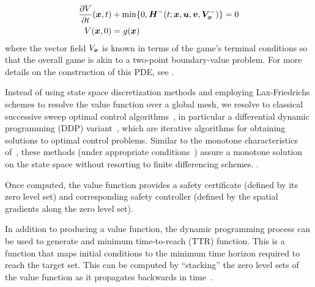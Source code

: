 	\begin{align}
		\frac{\partial V}{\partial t}{(\bm{x}, t)} & + \min \{0, \lowerham (t; \bm{x}, \bm{u}, \bm{v},\lowervalue_{\state}) \} = 0 \\
		V(\bm{x},0) &= g(\bm{x})
		\label{eq:lower_hji_pde}
	\end{align}
%
\noindent where the vector field $V_{\bm{x}}$ is known in terms of the game's terminal conditions so that the overall game is akin to a two-point boundary-value problem. For more details on the construction of this PDE, see \citet{Mitchell2005}.

Instead of using state space discretization methods and employing Lax-Friedrichs schemes to resolve the value function   over a global mesh, we resolve to classical successive sweep optimal control algorithms~\citet{Mitter1966, McReynolds1967}, in particular a differential dynamic programming (DDP) variant~\citet{Mayne1966, Jacobson1968new, JacobsonMayne}, which are iterative algorithms for obtaining solutions to optimal control problems. Similar to the monotone  characteristics of~\citet{CrandallLaxFriedrichs, CrandallFractional}, these methods (under appropriate conditions~\citet{iDG}) assure a monotone solution on the state space without resorting to finite differencing schemes.  
.
 

Once computed, the value function provides a safety certificate (defined by its zero level set) and corresponding safety controller (defined by the spatial gradients along the zero level set). 

In addition to producing a value function, the dynamic programming process can be used to generate and minimum time-to-reach (TTR) function. This is a function that maps initial conditions to the minimum time horizon required to reach the target set.  This can be computed by ``stacking'' the zero level sets of the value function as it propagates backwards in time~\citet{Mitchell2020, BasarBook, AthansFalb}.  


